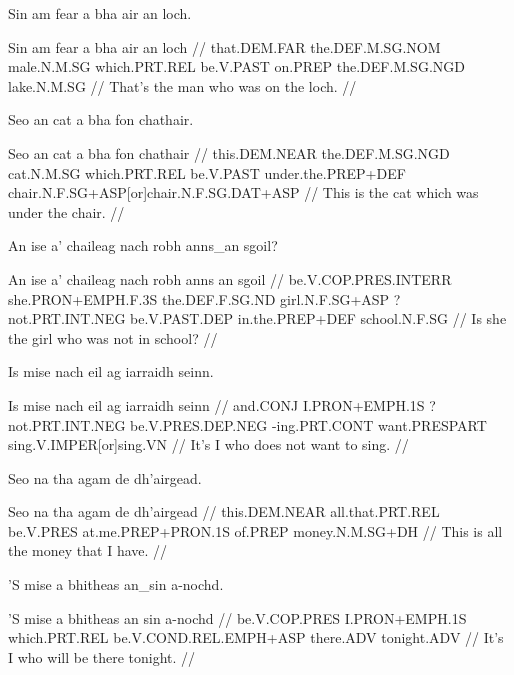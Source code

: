 \documentclass[a4paper,10pt]{article}
\title{\Large\headword{\color{mygreen}{Sentences from D. M'Clelland's \textit{Taic}}}}
\author{Bangor Autoglosser proof-of-concept}
\date{}
\begin{document}
\maketitle

\ex
\begingl
\glpre Sin am fear a bha air an loch. 

\vspace{4mm}
\gla Sin am fear a bha air an loch  //
\glb that.DEM.FAR the.DEF.M.SG.NOM male.N.M.SG which.PRT.REL be.V.PAST on.PREP the.DEF.M.SG.NGD lake.N.M.SG  //
\glft That's the man who was on the loch. //
\endgl
\xe

\ex
\begingl
\glpre Seo an cat a bha fon chathair. 

\vspace{4mm}
\gla Seo an cat a bha fon chathair  //
\glb this.DEM.NEAR the.DEF.M.SG.NGD cat.N.M.SG which.PRT.REL be.V.PAST under.the.PREP+DEF chair.N.F.SG+ASP[or]chair.N.F.SG.DAT+ASP  //
\glft This is the cat which was under the chair. //
\endgl
\xe

\ex
\begingl
\glpre An ise a' chaileag nach robh anns\_an sgoil? 

\vspace{4mm}
\gla An ise a' chaileag nach robh {anns an} sgoil  //
\glb be.V.COP.PRES.INTERR she.PRON+EMPH.F.3S the.DEF.F.SG.ND girl.N.F.SG+ASP ?not.PRT.INT.NEG be.V.PAST.DEP in.the.PREP+DEF school.N.F.SG  //
\glft Is she the girl who was not in school? //
\endgl
\xe

\ex
\begingl
\glpre Is mise nach eil ag iarraidh seinn. 

\vspace{4mm}
\gla Is mise nach eil ag iarraidh seinn  //
\glb and.CONJ I.PRON+EMPH.1S ?not.PRT.INT.NEG be.V.PRES.DEP.NEG -ing.PRT.CONT want.PRESPART sing.V.IMPER[or]sing.VN  //
\glft It's I who does not want to sing. //
\endgl
\xe

\ex
\begingl
\glpre Seo na tha agam de dh'airgead. 

\vspace{4mm}
\gla Seo na tha agam de dh'airgead  //
\glb this.DEM.NEAR all.that.PRT.REL be.V.PRES at.me.PREP+PRON.1S of.PREP money.N.M.SG+DH  //
\glft This is all the money that I have. //
\endgl
\xe

\ex
\begingl
\glpre 'S mise a bhitheas an\_sin a-nochd. 

\vspace{4mm}
\gla 'S mise a bhitheas {an sin} a-nochd  //
\glb be.V.COP.PRES I.PRON+EMPH.1S which.PRT.REL be.V.COND.REL.EMPH+ASP there.ADV tonight.ADV  //
\glft It's I who will be there tonight. //
\endgl
\xe
\end{document}

